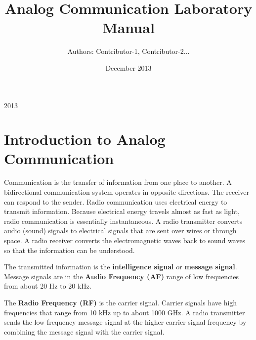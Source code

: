 \documentclass{book}
\begin{document}
\thispagestyle{empty}
\thispagestyle{empty}

\title{Analog Communication
Laboratory Manual}
\date{December 2013}
\author {Authors: Contributor-1, Contributor-2...}
\maketitle
  
\textcopyright{}2013 
\\[10cm]
    






\thispagestyle{empty}
\tableofcontents
\thispagestyle{empty}
\thispagestyle{empty}

\listoffigures
\thispagestyle{empty}

\chapter [Introduction to Analog Communication]{Introduction to Analog Communication}


\cite{ACmanual}Communication is the transfer of information from one place to another. A bidirectional communication system operates in opposite directions. The receiver can respond
to the sender. Radio communication uses electrical energy to transmit information. Because electrical energy travels almost as fast as light, radio communication is essentially instantaneous.
A radio transmitter converts audio (sound) signals to electrical signals that are sent over wires or through space. A radio receiver converts the electromagnetic waves back to sound waves so that the
information can be understood. 

The transmitted information is the \textbf {intelligence signal} or \textbf{ message signal}.
 Message signals are in the \textbf {Audio Frequency (AF)} range of low frequencies from about 20 Hz to 20 kHz.
 
 
The \textbf{Radio Frequency (RF)}  is the carrier signal. Carrier signals have high frequencies that range from 10 kHz up to about 1000 GHz.
A radio transmitter sends the low frequency message signal at the higher carrier signal frequency by combining the message signal with the carrier signal.
\end{document}
